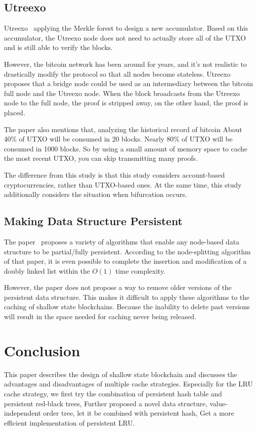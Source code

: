 \documentclass[conference]{IEEEtran}
\begin{document}
\subsection{Utreexo}
Utreexo~\cite{b1} applying the Merkle forest to  design a new accumulator.
Based on this accumulator, the Utreexo node does not need to actually store all of the UTXO and is still able to verify the blocks.

However, the bitcoin network has been around for years, and it's not realistic to drastically modify the protocol so that all nodes become stateless.
Utreexo proposes that a bridge node could be used as an intermediary between the bitcoin full node and the Utreexo node.
When the block broadcasts from the Utreexo node to the full node, the proof is stripped away, on the other hand, the proof is placed.

The paper also mentions that, analyzing the historical record of bitcoin
About 40\% of UTXO will be consumed in 20 blocks.
Nearly 80\% of UTXO will be consumed in 1000 blocks.
So by using a small amount of memory space to cache the most recent UTXO, you can skip transmitting many proofs.

The difference from this study is that this study considers account-based cryptocurrencies, rather than UTXO-based ones.
At the same time, this study additionally considers the situation when bifurcation occurs.

\subsection{Making Data Structure Persistent}

The paper~\cite{b2} proposes a variety of algorithms that enable any node-based data structure to be partial/fully persistent.
According to the node-splitting algorithm of that paper, it is even possible to complete the insertion and modification of a doubly linked list within the $O(1)$ time complexity.

However, the paper does not propose a way to remove older versions of the persistent data structure.
This makes it difficult to apply these algorithms to the caching of shallow state blockchains.
Because the inability to delete past versions will result in the space needed for caching never being released.

\section{Conclusion}
This paper describes the design of shallow state blockchain and discusses the advantages and disadvantages of multiple cache strategies.
Especially for the LRU cache strategy, 
we first try the combination of persistent hash table and persistent red-black trees,
Further proposed a novel data structure, value-independent order tree, let it be combined with persistent hash,
Get a more efficient implementation of persistent LRU.
\end{document}
